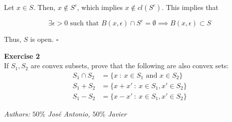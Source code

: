 \documentclass[11pt,table]{article}
\newcommand{\qed}{\hfill $\square$}
\newenvironment{problem}[2][Exercise]
{ \begin{mdframed}[backgroundcolor=gray!20] \textbf{#1 #2} \\}
	{\hspace{0.0cm}\newline\newline \emph{Authors: \(50\%\) José Antonio, \(50\%\) Javier}  \end{mdframed}}
\begin{document}
Let \(x \in S\). Then, \(x \notin S^c\), which implies \(x \notin cl(S^c)\). This implies that

\[
	\exists \epsilon > 0 \text{ such that } B(x,\epsilon) \cap S^c = \emptyset \implies B(x,\epsilon) \subset S
\]

Thus, $S$ is open. \qed \\

\begin{problem}{2}
If \( S_1, S_2 \) are convex subsets, prove that the following are also convex sets:
\begin{align*}
	S_{1} \cap S_{2} & = \{x \ : \ x \in S_{1} \text{ and } x \in S_{2}\} \\
	S_{1} + S_{2}    & = \{x + x' \ : \ x \in S_{1}, x' \in S_{2}\}       \\
	S_{1} - S_{2}    & = \{x - x' \ : \ x \in S_{1}, x' \in S_{2}\}
\end{align*}

\end{problem}
\end{document}
